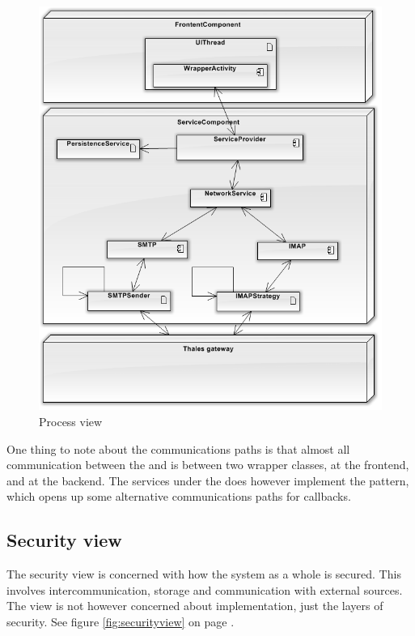 \begin{figure}[H]
	\includegraphics[width=\textwidth]{processview.png}
	\caption{Process view}
	\label{fig:processview}
\end{figure}

\pagebreak

One thing to note about the communications paths is that almost all communication between the  and  is between two wrapper classes,  at the frontend, and  at the backend. The services under the  does however implement the  pattern, which opens up some alternative communications paths for callbacks.

\subsection{Security view}
The security view is concerned with how the system as a whole is secured. This involves intercommunication, storage and communication with external sources. The view is not however concerned about implementation, just the layers of security.
See figure \ref{fig:securityview} on page \pageref{fig:securityview}.

